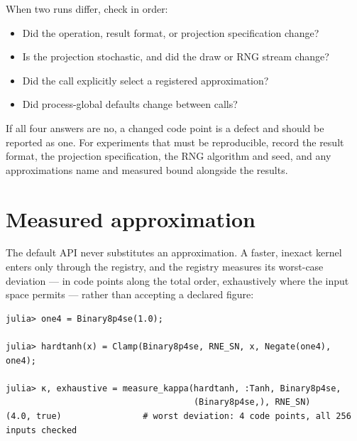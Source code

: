 \label{17718339924439357099}{}


When two runs differ, check in order:



\begin{itemize}
\item[1. ] Did the operation, result format, or projection specification change?


\item[2. ] Is the projection stochastic, and did the draw or RNG stream change?


\item[3. ] Did the call explicitly select a registered approximation?


\item[4. ] Did process-global defaults change between calls?

\end{itemize}


If all four answers are no, a changed code point is a defect and should be reported as one. For experiments that must be reproducible, record the result format, the projection specification, the RNG algorithm and seed, and any approximation{\textquotesingle}s name and measured bound alongside the results.



\section{Measured approximation}



\label{2780525639147152128}{}


The default API never substitutes an approximation. A faster, inexact kernel enters only through the registry, and the registry measures its worst-case deviation — in code points along the total order, exhaustively where the input space permits — rather than accepting a declared figure:




\begin{verbatim}
julia> one4 = Binary8p4se(1.0);

julia> hardtanh(x) = Clamp(Binary8p4se, RNE_SN, x, Negate(one4), one4);

julia> κ, exhaustive = measure_kappa(hardtanh, :Tanh, Binary8p4se,
                                     (Binary8p4se,), RNE_SN)
(4.0, true)                # worst deviation: 4 code points, all 256 inputs checked
\end{verbatim}



